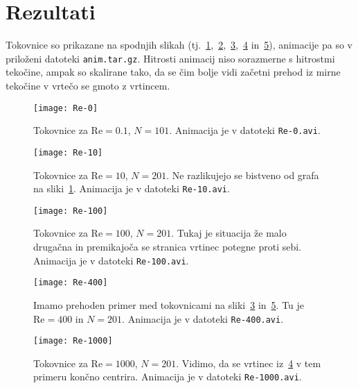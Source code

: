 \documentclass[a4 paper, 12pt]{article}
\renewcommand{\Re}{
    \ensuremath{\mathrm{Re}}
}
\begin{document}
\section{Rezultati}

Tokovnice so prikazane na spodnjih slikah (tj.~\ref{gr1},~\ref{gr1a},~\ref{gr2},~\ref{gr-prehod} in~\ref{gr3}),
animacije pa so v prilo\v zeni datoteki {\tt anim.tar.gz}. Hitrosti animacij niso sorazmerne s hitrostmi teko\v cine,
ampak so skalirane tako, da se \v cim bolje vidi za\v cetni prehod iz mirne teko\v cine v vrte\v co se gmoto z
vrtincem.

\begin{figure}[H]\centering
    \texttt{[image: Re-0]}
    \caption{Tokovnice za $\Re = 0.1$, $N = 101$. Animacija je v datoteki {\tt Re-0.avi}.}
    \label{gr1}
\end{figure}

\begin{figure}[H]\centering
    \texttt{[image: Re-10]}
    \caption{Tokovnice za $\Re = 10$, $N = 201$. Ne razlikujejo se bistveno od
    grafa na sliki~\ref{gr1}. Animacija je v datoteki {\tt Re-10.avi}.}
    \label{gr1a}
\end{figure}

\begin{figure}[H]\centering
    \texttt{[image: Re-100]}
    \caption{Tokovnice za $\Re = 100$, $N = 201$. Tukaj je situacija \v ze malo druga\v cna
    in premikajo\v ca se stranica vrtinec potegne proti sebi. Animacija je v datoteki
    {\tt Re-100.avi}.}
    \label{gr2}
\end{figure}

\begin{figure}[H]\centering
    \texttt{[image: Re-400]}
    \caption{Imamo prehoden primer med tokovnicami na sliki~\ref{gr2} in~\ref{gr3}. Tu je
    $\Re = 400$ in $N = 201$. Animacija je v datoteki {\tt Re-400.avi}.}
    \label{gr-prehod}
\end{figure}

\begin{figure}[H]\centering
    \texttt{[image: Re-1000]}
    \caption{Tokovnice za $\Re = 1000$, $N = 201$. Vidimo, da se vrtinec iz~\ref{gr-prehod} v tem
    primeru kon\v cno centrira. Animacija je v datoteki {\tt Re-1000.avi}.}
    \label{gr3}
\end{figure}
\end{document}
